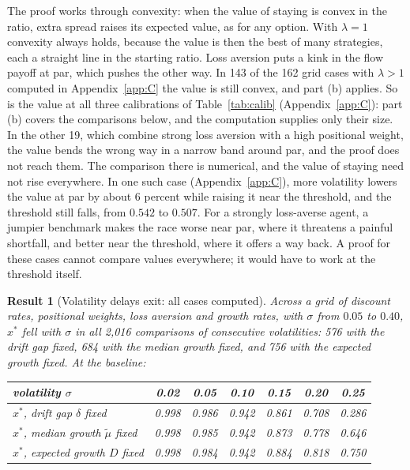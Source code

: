 \documentclass[12pt]{article}
\newtheorem{result}{Result}
\theoremstyle{definition}
\theoremstyle{remark}
\newcommand{\mut}{\tilde\mu}
\theoremstyle{plain}
\theoremstyle{definition}
\begin{document}
The proof works through convexity: when the value of staying is convex in the ratio, extra spread raises its expected value, as for any option. With $\lambda=1$ convexity always holds, because the value is then the best of many strategies, each a straight line in the starting ratio. Loss aversion puts a kink in the flow payoff at par, which pushes the other way. In 143 of the 162 grid cases with $\lambda>1$ computed in Appendix~\ref{app:C} the value is still convex, and part (b) applies. So is the value at all three calibrations of Table~\ref{tab:calib} (Appendix~\ref{app:C}): part (b) covers the comparisons below, and the computation supplies only their size. In the other 19, which combine strong loss aversion with a high positional weight, the value bends the wrong way in a narrow band around par, and the proof does not reach them. The comparison there is numerical, and the value of staying need not rise everywhere. In one such case (Appendix~\ref{app:C}), more volatility lowers the value at par by about 6 percent while raising it near the threshold, and the threshold still falls, from $0.542$ to $0.507$. For a strongly loss-averse agent, a jumpier benchmark makes the race worse near par, where it threatens a painful shortfall, and better near the threshold, where it offers a way back. A proof for these cases cannot compare values everywhere; it would have to work at the threshold itself.

\begin{result}[Volatility delays exit: all cases computed]\label{res:vol}
Across a grid of discount rates, positional weights, loss aversion and growth rates, with $\sigma$ from $0.05$ to $0.40$, $x^*$ fell with $\sigma$ in all 2,016 comparisons of consecutive volatilities: 576 with the drift gap fixed, 684 with the median growth fixed, and 756 with the expected growth fixed. At the baseline:
\begin{center}\small
\begin{tabular}{@{}lcccccc@{}}
\toprule
volatility $\sigma$ & 0.02 & 0.05 & 0.10 & 0.15 & 0.20 & 0.25 \\
\midrule
$x^*$, drift gap $\delta$ fixed & 0.998 & 0.986 & 0.942 & 0.861 & 0.708 & 0.286 \\
$x^*$, median growth $\mut$ fixed & 0.998 & 0.985 & 0.942 & 0.873 & 0.778 & 0.646 \\
$x^*$, expected growth $D$ fixed & 0.998 & 0.984 & 0.942 & 0.884 & 0.818 & 0.750 \\
\bottomrule
\end{tabular}
\end{center}
\end{result}
\end{document}
